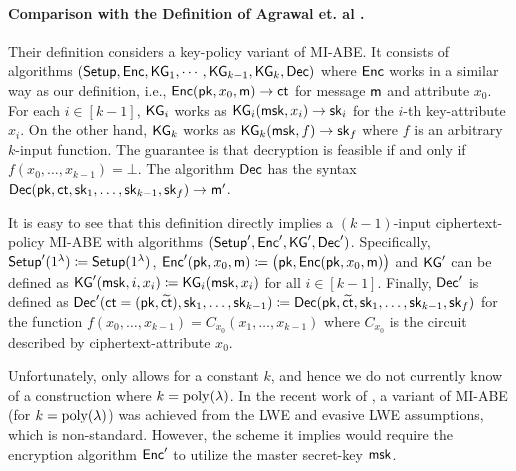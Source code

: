 \paragraph{Comparison with the Definition of Agrawal et.
al \cite{C:ARYY23}.}

Their definition considers a key-policy variant of MI-ABE. It
consists of algorithms $(\mathsf{Setup}, \mathsf{Enc}, \mathsf{KG}_1, \cdots,\allowbreak
\mathsf{KG}_{k-1}, \mathsf{KG}_k, \mathsf{Dec})$ where $\mathsf{Enc}$ works in a similar way
as our definition, i.e., $\mathsf{Enc}(\mathsf{pk},\allowbreak x_0, \mathsf{m}) \rightarrow \mathsf{ct}$ for message
$\mathsf{m}$ and attribute $x_0$. For each $i \in [k-1]$, $\mathsf{KG}_i$ works
as $\mathsf{KG}_i(\mathsf{msk}, x_i) \rightarrow \mathsf{sk}_i$ for the $i$-th key-attribute
$x_i$. On the other hand, $\mathsf{KG}_k$ works as $\mathsf{KG}_k(\mathsf{msk}, f)
\rightarrow \mathsf{sk}_f$ where $f$ is an arbitrary $k$-input function. The
guarantee is that decryption is feasible if and only if
$f(x_0, \ldots, x_{k-1}) = \bot$. The algorithm $\mathsf{Dec}$ has the
syntax $\mathsf{Dec}(\mathsf{pk}, \mathsf{ct}, \mathsf{sk}_1, \ldots, \mathsf{sk}_{k-1}, \mathsf{sk}_f) \rightarrow \mathsf{m}'$.


It is easy to see that this definition directly implies a
$(k-1)$-input ciphertext-policy MI-ABE with algorithms $(\mathsf{Setup}',
\mathsf{Enc}', \mathsf{KG}', \mathsf{Dec}')$. Specifically, $\mathsf{Setup}'(1^\lambda) \coloneqq
\mathsf{Setup}(1^\lambda)$, $\mathsf{Enc}'(\mathsf{pk}, x_0, \mathsf{m}) \coloneqq \big(\mathsf{pk}, \mathsf{Enc}(\mathsf{pk},
x_0, \mathsf{m})\big)$ and $\mathsf{KG}'$ can be defined as $\mathsf{KG}'(\mathsf{msk}, i, x_i)
\coloneqq \mathsf{KG}_i(\mathsf{msk}, x_i)$ for all $i \in [k-1]$. Finally, $\mathsf{Dec}'$ is
defined as $\mathsf{Dec}'(\mathsf{ct} = (\mathsf{pk}, \widetilde{\mathsf{ct}}), \mathsf{sk}_1, \ldots,
\mathsf{sk}_{k-1}) \coloneqq \mathsf{Dec}(\mathsf{pk}, \widetilde{\mathsf{ct}}, \mathsf{sk}_1, \ldots,
\mathsf{sk}_{k-1}, \mathsf{sk}_f)$ for the function $f(x_0, \ldots, x_{k-1}) =
C_{x_0}(x_1, \ldots, x_{k-1})$ where $C_{x_0}$ is the circuit
described by ciphertext-attribute $x_0$.

Unfortunately, \cite{C:ARYY23} only allows for a constant $k$, and
hence we do not currently know of a construction where
$k={\mathrm{poly}}(\lambda)$. In the recent work of \cite{myEPRINT:AgrKumYam24a}, a
variant of MI-ABE (for $k={\mathrm{poly}}(\lambda)$) was achieved from the LWE and evasive LWE assumptions, which is non-standard.
However, the scheme it implies would require the encryption algorithm $\mathsf{Enc}'$ to utilize the master secret-key
$\mathsf{msk}$.

